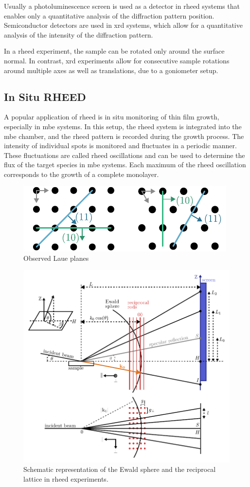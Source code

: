 Usually a photoluminescence screen is used as a detector in \ac{rheed} systems that 
enables only a quantitative analysis of the diffraction pattern position.
Semiconductor detectors are used in \ac{xrd} systems, which allow for a quantitative
analysis of the intensity of the diffraction pattern. 

In a \ac{rheed} experiment, the sample can be rotated only around the surface normal.
In contrast, \ac{xrd} experiments allow for consecutive sample rotations around multiple
axes as well as translations, due to a goniometer setup. 

\subsection{In Situ RHEED} \label{sec:in_situ_rheed}
A popular application of \ac{rheed} is in situ monitoring of thin film growth, 
especially in \ac{mbe} systems.
In this setup, the \ac{rheed} system is integrated into the \ac{mbe} chamber, 
and the \ac{rheed} pattern is recorded during the growth process.
The intensity of individual spots is monitored and fluctuates 
in a periodic manner.
These fluctuations are called \ac{rheed} oscillations and can be used to determine the
flux of the target species in \ac{mbe} systems.
Each maximum of the \ac{rheed} oscillation corresponds to the growth of 
a complete monolayer.

\begin{figure}
    \centering
    \includegraphics{../assets/planes.pdf}
	\caption{Observed Laue planes}
	\label{fig:planes}
\end{figure}

\begin{figure}
	\includegraphics{../assets/rheed_2.pdf}
	\caption{Schematic representation of the Ewald sphere and the reciprocal lattice
	in \ac{rheed} experiments. }
	\label{fig:rheed_2}
\end{figure}

